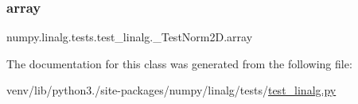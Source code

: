 \subsubsection{\texorpdfstring{array}{array}}
{\footnotesize\ttfamily numpy.\+linalg.\+tests.\+test\+\_\+linalg.\+\_\+\+Test\+Norm2\+D.\+array\hspace{0.3cm}{\ttfamily [static]}}



The documentation for this class was generated from the following file\+:\begin{DoxyCompactItemize}
\item 
venv/lib/python3./site-\/packages/numpy/linalg/tests/\hyperlink{test__linalg_8py}{test\+\_\+linalg.\+py}\end{DoxyCompactItemize}
